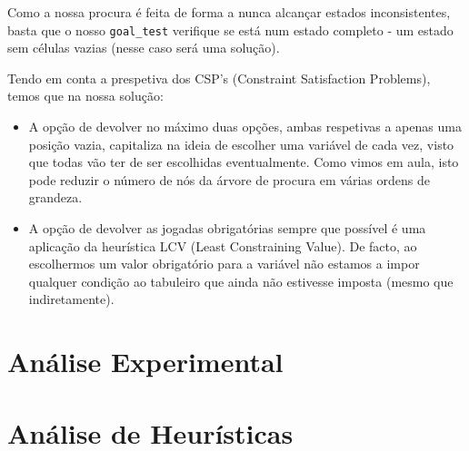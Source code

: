 \documentclass[12pt,a4paper]{article}
\begin{document}
  Como a nossa procura é feita de forma a nunca alcançar estados inconsistentes, basta que o nosso \texttt{goal\_test} verifique se está num estado completo - um estado sem células vazias (nesse caso será uma solução).

  Tendo em conta a prespetiva dos CSP's (Constraint Satisfaction Problems), temos que na nossa solução:
  \begin{itemize}
    \item A opção de devolver no máximo duas opções, ambas respetivas a apenas uma posição vazia, capitaliza na ideia de escolher uma variável de cada vez, visto que todas vão ter de ser escolhidas eventualmente. 
      Como vimos em aula, isto pode reduzir o número de nós da árvore de procura em várias ordens de grandeza.
    \item A opção de devolver as jogadas obrigatórias sempre que possível é uma aplicação da heurística LCV (Least Constraining Value).
      De facto, ao escolhermos um valor obrigatório para a variável não estamos a impor qualquer condição ao tabuleiro que ainda não estivesse imposta (mesmo que indiretamente).
  \end{itemize}

  \section*{Análise Experimental}



  \section*{Análise de Heurísticas}
  
\end{document}
